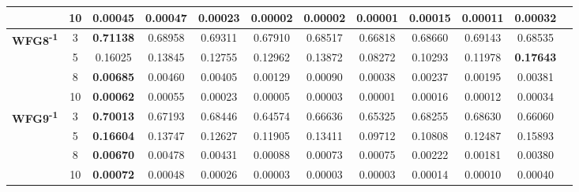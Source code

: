 \documentclass{sig-alternate}
\begin{document}
\begin{table}[!htb]
\begin{tabular}{|c|c|c|c|c|c|c|c|c|c|c|c|}
                                                      & 10         & 0.00045            & \textbf{0.00047}   & 0.00023               & 0.00002          & 0.00002             & 0.00001             & 0.00015            & 0.00011              & 0.00032            \\ \hline
\multirow{4}{*}{\textbf{WFG8\textsuperscript{-1}}}  & 3          & \textbf{0.71138}   & 0.68958            & 0.69311               & 0.67910          & 0.68517             & 0.66818             & 0.68660            & 0.69143              & 0.68535            \\ \cline{2-11} 
                                                      & 5          & 0.16025            & 0.13845            & 0.12755               & 0.12962          & 0.13872             & 0.08272             & 0.10293            & 0.11978              & \textbf{0.17643}   \\ \cline{2-11} 
                                                      & 8          & \textbf{0.00685}   & 0.00460            & 0.00405               & 0.00129          & 0.00090             & 0.00038             & 0.00237            & 0.00195              & 0.00381            \\ \cline{2-11} 
                                                      & 10         & \textbf{0.00062}   & 0.00055            & 0.00023               & 0.00005          & 0.00003             & 0.00001             & 0.00016            & 0.00012              & 0.00034            \\ \hline
\multirow{4}{*}{\textbf{WFG9\textsuperscript{-1}}}  & 3          & \textbf{0.70013}   & 0.67193            & 0.68446               & 0.64574          & 0.66636             & 0.65325             & 0.68255            & 0.68630              & 0.66060            \\ \cline{2-11} 
                                                      & 5          & \textbf{0.16604}   & 0.13747            & 0.12627               & 0.11905          & 0.13411             & 0.09712             & 0.10808            & 0.12487              & 0.15893            \\ \cline{2-11} 
                                                      & 8          & \textbf{0.00670}   & 0.00478            & 0.00431               & 0.00088          & 0.00073             & 0.00075             & 0.00222            & 0.00181              & 0.00380            \\ \cline{2-11} 
                                                      & 10         & \textbf{0.00072}   & 0.00048            & 0.00026               & 0.00003          & 0.00003             & 0.00003             & 0.00014            & 0.00010              & 0.00040            \\ \hline
	\end{tabular}
\end{table}
\end{document}
